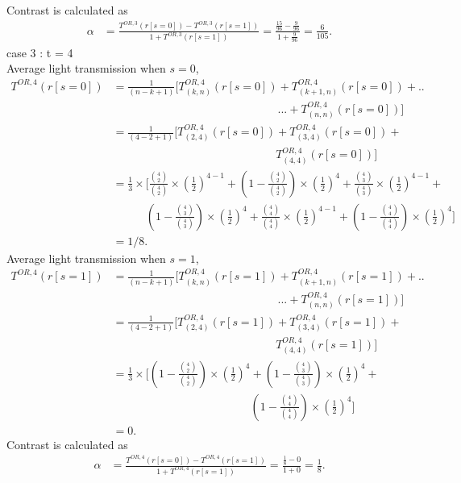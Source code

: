 Contrast is calculated as  
\begin{align*}
\alpha &= \frac{T^{OR,3}(r[s=0]) - T^{OR,3}(r[s=1])}{1 +T^{OR,3}(r[s=1])}
= \frac{\frac{15}{96}-\frac{9}{96}}{1+\frac{9}{96}} = \frac{6}{105}. 
\end{align*}
case 3 : t = 4\\
Average light transmission when $s=0$,
\begin{align*}
T^{OR,4}(r[s=0]) &= \frac{1}{(n-k+1)} [T^{OR,4}_{(k,n)} (r[s=0]) + T^{OR,4}_{(k+1,n)} (r[s=0]) + ..\\&\phantom{{}=\frac{1}{(n-k+1)} [T^{OR,4}_{(k,n)} (r[s=0])}... + T^{OR,4}_{(n,n)} (r[s=0])]\\
&= \frac{1}{(4-2+1)} [T^{OR,4}_{(2,4)} (r[s=0]) + T^{OR,4}_{(3,4)} (r[s=0]) +\\&\phantom{{}=\frac{1}{(4-2+1)} [T^{OR,4}_{(2,4)} (r[s=0])} T^{OR,4}_{(4,4)} (r[s=0])]\\
&= \frac{1}{3} \times [ \frac {\binom 42}{\binom 42} \times (\frac{1}{2})^{4-1} +  (1-  \frac {\binom 42}{\binom 42})\times (\frac{1}{2})^{4} + \frac {\binom 43}{\binom 43} \times (\frac{1}{2})^{4-1} +\\&\phantom{{}=\frac{1}{3} \times}  (1-  \frac {\binom 43}{\binom 43})\times (\frac{1}{2})^{4} + \frac {\binom 44}{\binom 44} \times (\frac{1}{2})^{4-1} +  (1-  \frac {\binom 44}{\binom 44})\times (\frac{1}{2})^{4}]\\
& = 1/8.
\end{align*}
Average light transmission when $s=1$,
\begin{align*}
T^{OR,4}(r[s=1]) &= \frac{1}{(n-k+1)} [T^{OR,4}_{(k,n)} (r[s=1]) + T^{OR,4}_{(k+1,n)} (r[s=1]) + ..\\&\phantom{{}=\frac{1}{(n-k+1)} [T^{OR,4}_{(k,n)} (r[s=1])}... + T^{OR,4}_{(n,n)} (r[s=1])]\\
&= \frac{1}{(4-2+1)} [T^{OR,4}_{(2,4)} (r[s=1]) + T^{OR,4}_{(3,4)} (r[s=1]) +\\&\phantom{{}=\frac{1}{(4-2+1)} [T^{OR,4}_{(2,4)} (r[s=1])} T^{OR,4}_{(4,4)} (r[s=1])]\\
&= \frac{1}{3} \times [(1-  \frac {\binom 42}{\binom 42})\times (\frac{1}{2})^{4} + (1-  \frac {\binom 43}{\binom 43})\times (\frac{1}{2})^{4} +\\&\phantom{{}=\frac{1}{3} \times [(1-  \frac {\binom 42}{\binom 42})\times (\frac{1}{2})^{4}} (1-  \frac {\binom 44}{\binom 44})\times (\frac{1}{2})^{4}]\\
&= 0.
\end{align*}
Contrast is calculated as  
\begin{align*}
\alpha &= \frac{T^{OR,4}(r[s=0]) - T^{OR,4}(r[s=1])}{1 +T^{OR,4}(r[s=1])} = \frac{\frac{1}{8}-0}{1+0} = \frac{1}{8}.
\end{align*}
